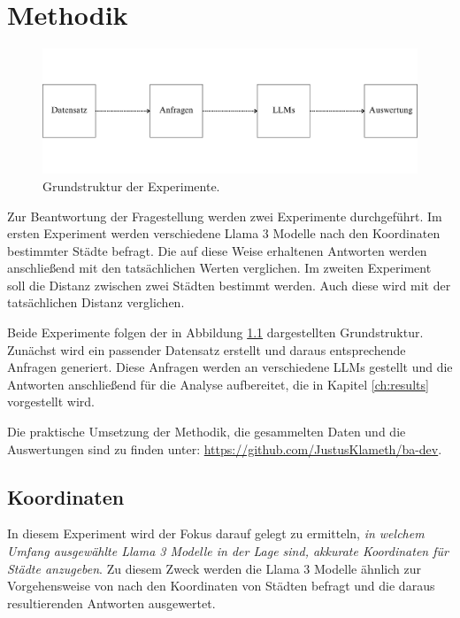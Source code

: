 \chapter{Methodik}
\label{ch:methods}


\begin{figure}[tb]
    \centering
    \includegraphics[width=0.95\columnwidth]{img/Ablaufdiagramm.pdf}%
    \caption{Grundstruktur der Experimente.}
    \label{fig_ablauf}
\end{figure}

Zur Beantwortung der Fragestellung werden zwei Experimente durchgeführt.
Im ersten Experiment werden verschiedene Llama 3 Modelle nach den Koordinaten bestimmter Städte befragt.
Die auf diese Weise erhaltenen Antworten werden anschließend mit den tatsächlichen Werten verglichen.
Im zweiten Experiment soll die Distanz zwischen zwei Städten bestimmt werden. Auch diese wird mit der tatsächlichen Distanz verglichen.

Beide Experimente folgen der in Abbildung \ref{fig_ablauf} dargestellten Grundstruktur. Zunächst wird ein passender Datensatz erstellt und daraus entsprechende Anfragen generiert. Diese Anfragen werden an verschiedene LLMs gestellt und die Antworten anschließend für die Analyse aufbereitet, die in Kapitel \ref{ch:results} vorgestellt wird.

Die praktische Umsetzung der Methodik, die gesammelten Daten und die Auswertungen sind zu finden unter: \url{https://github.com/JustusKlameth/ba-dev}.

\section{Koordinaten}
\label{methods_coords}
In diesem Experiment wird der Fokus darauf gelegt zu ermitteln, \textit{in welchem Umfang ausgewählte Llama 3 Modelle in der Lage sind, akkurate Koordinaten für Städte anzugeben}.
Zu diesem Zweck werden die Llama 3 Modelle ähnlich zur Vorgehensweise von \mbox{\citet{bhandariAreLargeLanguage2023}} nach den Koordinaten von Städten befragt und die daraus resultierenden Antworten ausgewertet.

